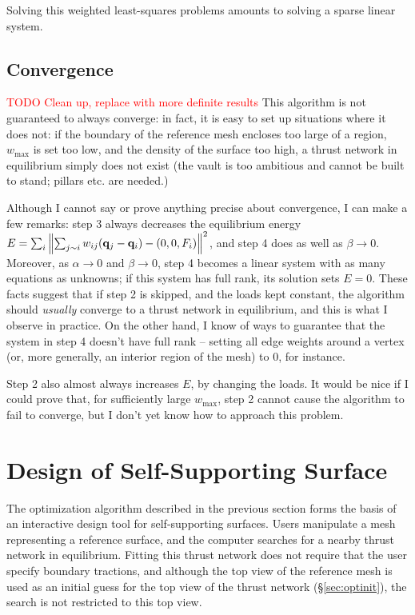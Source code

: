 \documentclass[annual]{acmsiggraph}
\newcommand{\todo}[1]{\textcolor{red}{#1}}
\newcommand{\secref}[1]{(\S\ref{#1})}
\begin{document}
Solving this weighted least-squares problems amounts to solving a sparse linear system.

\subsection{Convergence}
\todo{TODO Clean up, replace with more definite results}
This algorithm is not guaranteed to always converge: in fact, it is easy to set up situations where it does not: if the boundary of the reference mesh encloses too large of a region, $w_{\max}$ is set too low, and the density of the surface too high, a thrust network in equilibrium simply does not exist (the vault is too ambitious and cannot be built to stand; pillars etc. are needed.) 

Although I cannot say or prove anything precise about convergence, I can make a few remarks: step 3 always decreases the equilibrium energy $E=\sum_i \left\| \sum_{j\sim i} w_{ij} ({\mathbf q}_j - {\mathbf q}_i) - (0,0,F_i) \right\|^2$, and step 4 does as well as $\beta \to 0$. Moreover, as $\alpha \to 0$ and $\beta \to 0$, step 4 becomes a linear system with as many equations as unknowns; if this system has full rank, its solution sets $E=0$. These facts suggest that if step 2 is skipped, and the loads kept constant, the algorithm should \emph{usually} converge to a thrust network in equilibrium, and this is what I observe in practice. On the other hand, I know of ways to guarantee that the system in step 4 doesn't have full rank -- setting all edge weights around a vertex (or, more generally, an interior region of the mesh) to 0, for instance.

Step 2 also almost always increases $E$, by changing the loads. It would be nice if I could prove that, for sufficiently large $w_{\textrm{max}}$, step 2 cannot cause the algorithm to fail to converge, but I don't yet know how to approach this problem.

\section{Design of Self-Supporting Surface} \label{sec:design}
The optimization algorithm described in the previous section forms the basis of an interactive design tool for self-supporting surfaces. Users manipulate a mesh representing a reference surface, and the computer searches for a nearby thrust network in equilibrium. Fitting this thrust network does not require that the user specify boundary tractions, and although the top view of the reference mesh is used as an initial guess for the top view of the thrust network \secref{sec:optinit}, the search is not restricted to this top view.
\end{document}

